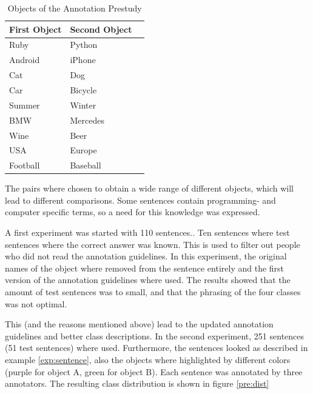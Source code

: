 \begin{table}[h]
\centering
\caption{Objects of the Annotation Prestudy}
\label{tbl:prestudy-objects}
\begin{tabular}{@{}lll@{}}
\toprule
First Object & Second Object                                      \\ \midrule
Ruby         & Python                                     \\
Android      & iPhone          \\
Cat          & Dog                                            \\ 
Car & Bicycle  \\
Summer & Winter  \\
BMW & Mercedes  \\
Wine & Beer  \\
USA & Europe  \\
Football             &          Baseball       \\       \midrule                                  
\end{tabular}
\end{table}

The pairs where chosen to obtain a wide range of different objects, which will lead to different comparisons. Some sentences contain programming- and computer specific terms, so a need for this knowledge was expressed.

A first experiment was started with 110 sentences.. Ten sentences where test sentences where the correct answer was known. This is used to filter out people who did not read the annotation guidelines. In this experiment, the original names of the object where removed from the sentence entirely and the first version of the annotation guidelines where used. The results showed that the amount of test sentences was to small, and that the phrasing of the four classes was not optimal.\newline

This (and the reasons mentioned above) lead to the updated annotation guidelines and better class descriptions. In the second experiment, 251 sentences (51 test sentences) where used. Furthermore, the sentences looked as described in example \ref{exp:sentence}, also the objects where highlighted by different colors (purple for object A, green for object B). Each sentence was annotated by three annotators. The resulting class distribution is shown in figure \ref{pre:dist}

